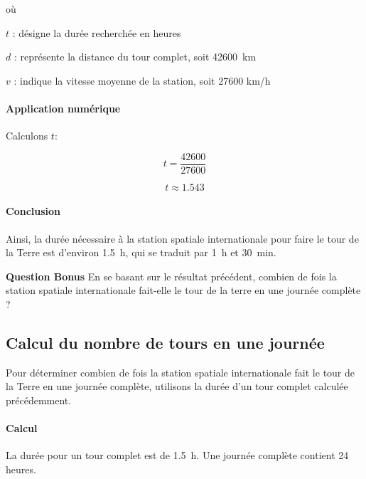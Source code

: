 \documentclass[answers]{exam}
\begin{document}
\begin{questions}
\begin{solution}
où 

\begin{addmargin}[4em]{1em}
  \begin{compactitem}
      \item [$t$]: désigne la durée recherchée en heures
      \item [$d$]: représente la distance du tour complet, soit \SI{42600}{\kilo\meter}
      \item [$v$]: indique la vitesse moyenne de la station, soit \num{27600} \unit[per-mode = symbol]{\kilo\meter\per\hour}
  \end{compactitem}
\end{addmargin}

\paragraph{Application numérique} 

Calculons $t$:

\[
t = \frac{42600}{27600}
\]

\[
t \approx 1.543
\]

\paragraph{Conclusion} 
Ainsi, la durée nécessaire à la station spatiale internationale pour faire le tour de la Terre est d'environ \SI{1.5}{\hour}, qui se traduit par \SI{1}{\hour} et \SI{30}{\minute}.
\end{solution}

\question[2] \textbf{Question Bonus} En se basant sur le résultat précédent, combien de fois la station spatiale internationale fait-elle le tour de la terre en une journée complète ?



\begin{solution}
\subsection*{Calcul du nombre de tours en une journée}

Pour déterminer combien de fois la station spatiale internationale fait le tour de la Terre en une journée complète, utilisons la durée d’un tour complet calculée précédemment.

\paragraph{Calcul}
La durée pour un tour complet est de \SI{1.5}{\hour}. Une journée complète contient 24 heures.


\end{solution}
\end{questions}
\end{document}
